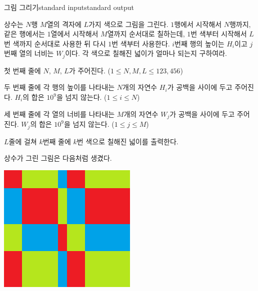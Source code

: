 \begin{problem}{그림 그리기}{standard input}{standard output}

상수는 $N$행 $M$열의 격자에 $L$가지 색으로 그림을 그린다. $1$행에서 시작해서 $N$행까지, 같은 행에서는 $1$열에서 시작해서 $M$열까지 순서대로 칠하는데, $1$번 색부터 시작해서 $L$번 색까지 순서대로 사용한 뒤 다시 $1$번 색부터 사용한다. $i$번째 행의 높이는 $H_i$이고 $j$번째 열의 너비는 $W_j$이다. 각 색으로 칠해진 넓이가 얼마나 되는지 구하여라.

\InputFile
첫 번째 줄에 $N$, $M$, $L$가 주어진다. ($1 \le N, M, L \le 123,456$)

두 번째 줄에 각 행의 높이를 나타내는 $N$개의 자연수 $H_i$가 공백을 사이에 두고 주어진다. $H_i$의 합은 $10^9$을 넘지 않는다. ($1 \le i \le N$)

세 번째 줄에 각 열의 너비를 나타내는 $M$개의 자연수 $W_j$가 공백을 사이에 두고 주어진다. $W_j$의 합은 $10^9$을 넘지 않는다. ($1 \le j \le M$)

\OutputFile
$L$줄에 걸쳐 $k$번째 줄에 $k$번 색으로 칠해진 넓이를 출력한다.

\Example

\begin{example}
%
\end{example}

\Notes

상수가 그린 그림은 다음처럼 생겼다.

\begin{center}
  \includegraphics[width=0.5\textwidth]{picture.png}
\end{center}

\end{problem}
